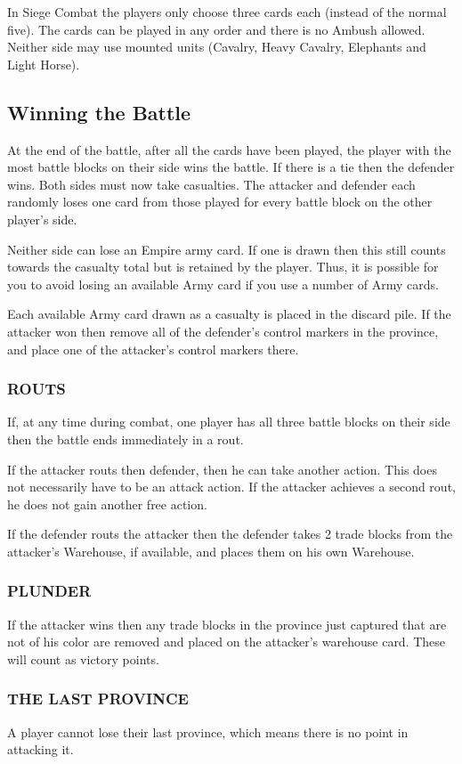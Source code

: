 In Siege Combat the players only choose three cards each (instead of the normal five). The cards can be played in any order and there is no Ambush allowed. Neither side may use mounted units (Cavalry, Heavy Cavalry, Elephants and Light Horse).

\subsection{Winning the Battle}

At the end of the battle, after all the cards have been played, the player with the most battle blocks on their side wins the battle. If there is a tie then the defender wins. Both sides must now take casualties. The attacker and defender each randomly loses one card from those played for every battle block on the other player’s side.

Neither side can lose an Empire army card. If one is drawn then this still counts towards the casualty total but is retained by the player. Thus, it is possible for you to avoid losing an available Army card if you use a number of Army cards.

Each available Army card drawn as a casualty is placed in the discard pile. If the attacker won then remove all of the defender’s control markers in the province, and place one of the attacker's control markers there.

\subsubsection{ROUTS}

If, at any time during combat, one player has all three battle blocks on their side then the battle ends immediately in a rout.

If the attacker routs then defender, then he can take another action. This does not necessarily have to be an attack action. If the attacker achieves a second rout, he does not gain another free action.

If the defender routs the attacker then the defender takes 2 trade blocks from the attacker’s Warehouse, if available, and places them on his own Warehouse.

\subsubsection{PLUNDER}

If the attacker wins then any trade blocks in the province just captured that are not of his color are removed and placed on the attacker’s warehouse card. These will count as victory points.

\subsubsection{THE LAST PROVINCE}

A player cannot lose their last province, which means there is no point in attacking it.
